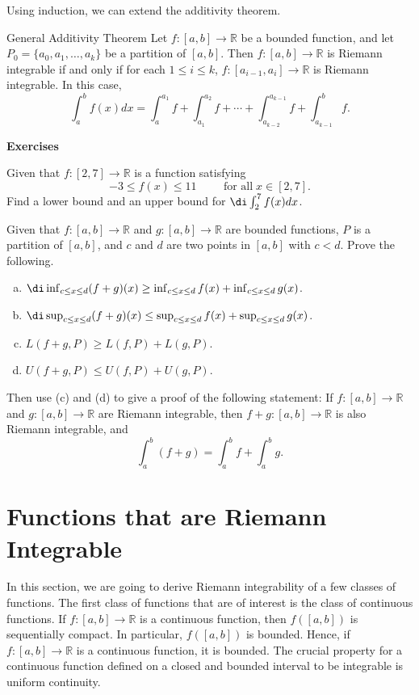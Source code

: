Using induction, we can extend the additivity theorem.
\begin{corollary}[label=230221_9]{General Additivity Theorem}
Let $f:[a,b]\to\mathbb{R}$ be a bounded function, and let $P_0=\{a_0, a_1, \ldots, a_k\}$ be a partition of $[a,b]$. Then $f:[a,b]\to\mathbb{R}$ is Riemann integrable if and only if for each $1\leq i\leq k$, $f:[a_{i-1},a_i]\to\mathbb{R}$ is Riemann integrable. In this case,
\[\int_a^b f(x)dx=\int_{a}^{a_1}f+\int_{a_1}^{a_2}f+\cdots+\int_{a_{k-2}}^{a_{k-1}}f+\int_{a_{k-1}}^bf.\]
\end{corollary}
\vp
\noindent
{\bf \large Exercises  \thesection}
\setcounter{myquestion}{1}

\begin{question}{\themyquestion}
Given that $f:[2, 7]\to\mathbb{R}$ is a function satisfying
\[-3\leq f(x)\leq 11\hspace{1cm} \text{for all}\;x\in [2, 7].\]
Find a lower bound and an upper bound for $\di \int_2^7f(x)dx$. 
\end{question}

\atc
\begin{question}{\themyquestion}
Given that $f:[a,b]\to\mathbb{R}$ and $g:[a,b]\to\mathbb{R}$ are bounded functions,  $P$ is a partition of $[a,b]$, and $c$ and $d$ are two points in $[a, b]$ with $c<d$. Prove the following.
\begin{enumerate}[(a)]
\item $\di\inf_{c\leq x\leq d}(f+g)(x)\geq \inf_{c\leq x\leq d}f(x)+\inf_{c\leq x\leq d}g(x)$.
\item  $\di\sup_{c\leq x\leq d}(f+g)(x)\leq \sup_{c\leq x\leq d}f(x)+\sup_{c\leq x\leq d}g(x)$.
\item $L(f+g, P)\geq L(f, P)+L(g, P)$.
\item $U(f+g,P)\leq U(f,P)+U(g,P)$.
\end{enumerate}
  Then use (c) and (d) to give a proof of the following statement: If  $f:[a,b]\to\mathbb{R}$ and $g:[a,b]\to\mathbb{R}$ are Riemann integrable, then $f+g:[a,b]\to\mathbb{R}$ is also Riemann integrable, and
\[\int_a^b(f+g)=\int_a^b f+\int_a^b g.\]
\end{question}

 

 
\vp

\section{Functions that are Riemann Integrable}\label{sec4.3}
In this section, we are going to derive Riemann integrability of a few classes of functions. The first class of functions that are of interest is the class of continuous  functions. If $f:[a,b]\to\mathbb{R}$ is a continuous function, then $f([a,b])$ is sequentially compact. In particular, $f([a,b])$ is bounded. Hence, if $f:[a,b]\to\mathbb{R}$ is a continuous function, it is bounded. 
The crucial property for a continuous function defined on a closed and bounded interval to be integrable is   uniform continuity.  

